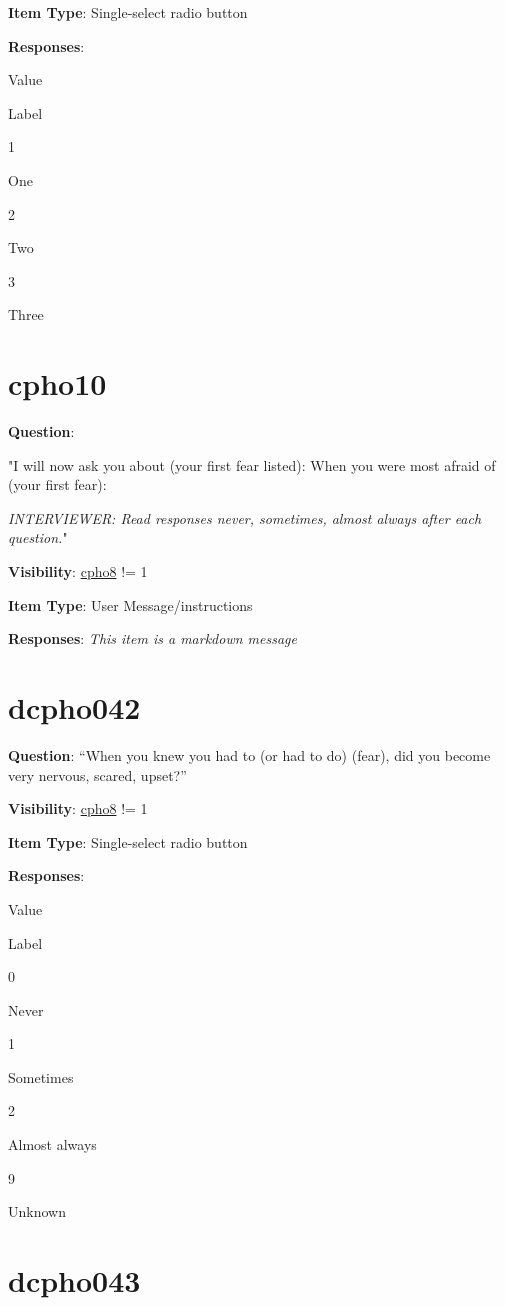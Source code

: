 \documentclass[]{book}
\begin{document}
\textbf{Item Type}: Single-select radio button

\textbf{Responses}:

Value

Label

1

One

2

Two

3

Three

\hypertarget{cpho10}{%
\section{cpho10}\label{cpho10}}

\textbf{Question}:

"I will now ask you about (your first fear listed): When you were most afraid of (your first fear):

\emph{INTERVIEWER: Read responses never, sometimes, almost always after each question.}"

\textbf{Visibility}: \protect\hyperlink{cpho8}{cpho8} != 1

\textbf{Item Type}: User Message/instructions

\textbf{Responses}: \emph{This item is a markdown message}

\hypertarget{dcpho042}{%
\section{dcpho042}\label{dcpho042}}

\textbf{Question}: ``When you knew you had to (or had to do) (fear), did you become very nervous, scared, upset?''

\textbf{Visibility}: \protect\hyperlink{cpho8}{cpho8} != 1

\textbf{Item Type}: Single-select radio button

\textbf{Responses}:

Value

Label

0

Never

1

Sometimes

2

Almost always

9

Unknown

\hypertarget{dcpho043}{%
\section{dcpho043}\label{dcpho043}}
\end{document}
